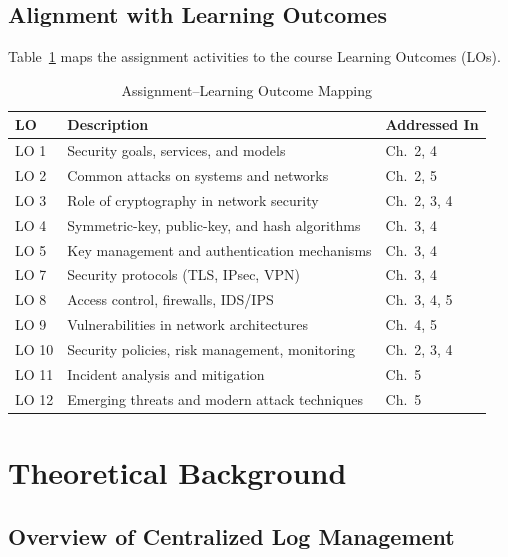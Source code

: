 \documentclass[12pt,a4paper]{report}
\begin{document}
\section{Alignment with Learning Outcomes}

Table~\ref{tab:lo-mapping} maps the assignment activities to the course Learning Outcomes (LOs).

\begin{table}[H]
\centering
\caption{Assignment--Learning Outcome Mapping}
\label{tab:lo-mapping}
\begin{tabularx}{\textwidth}{lXl}
\toprule
\textbf{LO} & \textbf{Description} & \textbf{Addressed In} \\
\midrule
LO 1  & Security goals, services, and models              & Ch.\ 2, 4 \\
LO 2  & Common attacks on systems and networks            & Ch.\ 2, 5 \\
LO 3  & Role of cryptography in network security          & Ch.\ 2, 3, 4 \\
LO 4  & Symmetric-key, public-key, and hash algorithms    & Ch.\ 3, 4 \\
LO 5  & Key management and authentication mechanisms      & Ch.\ 3, 4 \\
LO 7  & Security protocols (TLS, IPsec, VPN)              & Ch.\ 3, 4 \\
LO 8  & Access control, firewalls, IDS/IPS                & Ch.\ 3, 4, 5 \\
LO 9  & Vulnerabilities in network architectures          & Ch.\ 4, 5 \\
LO 10 & Security policies, risk management, monitoring    & Ch.\ 2, 3, 4 \\
LO 11 & Incident analysis and mitigation                  & Ch.\ 5 \\
LO 12 & Emerging threats and modern attack techniques     & Ch.\ 5 \\
\bottomrule
\end{tabularx}
\end{table}


\chapter{Theoretical Background}
\label{chap:theory}

\section{Overview of Centralized Log Management}
\end{document}
